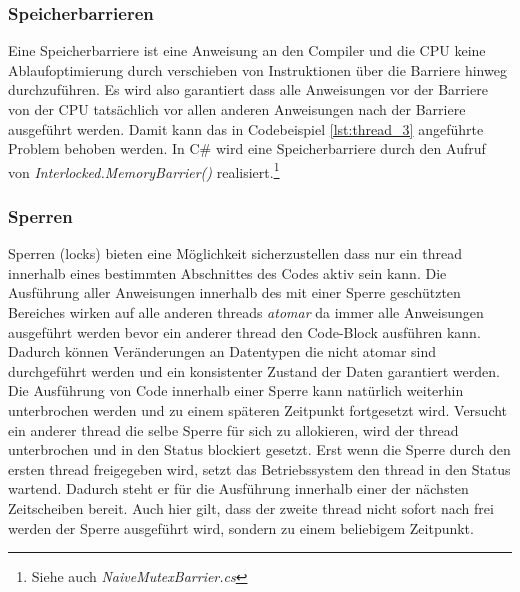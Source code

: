 \subsubsection{Speicherbarrieren}
Eine Speicherbarriere ist eine Anweisung an den Compiler und die CPU keine Ablaufoptimierung durch verschieben von Instruktionen über die Barriere hinweg durchzuführen. Es wird also garantiert dass alle Anweisungen vor der Barriere von der CPU tatsächlich vor allen anderen Anweisungen nach der Barriere ausgeführt werden.\cite[S. 195]{tanenbaum2016} Damit kann das in Codebeispiel \ref{lst:thread_3} angeführte Problem behoben werden. In C\# wird eine Speicherbarriere durch den Aufruf von \textit{Interlocked.MemoryBarrier()} realisiert.\cite{ms_interlocked_barrier}\footnote{Siehe auch \textit{NaiveMutexBarrier.cs}}

\subsubsection{Sperren}	
Sperren (locks) bieten eine Möglichkeit sicherzustellen dass nur ein thread innerhalb eines bestimmten Abschnittes des Codes aktiv sein kann. Die Ausführung aller Anweisungen innerhalb des mit einer Sperre geschützten Bereiches wirken auf alle anderen threads \textit{atomar} da immer alle Anweisungen ausgeführt werden bevor ein anderer thread den Code-Block ausführen kann. Dadurch können Veränderungen an Datentypen die nicht atomar sind durchgeführt werden und ein konsistenter Zustand der Daten garantiert werden. 
\\Die Ausführung von Code innerhalb einer Sperre kann natürlich weiterhin unterbrochen werden und zu einem späteren Zeitpunkt fortgesetzt wird. Versucht ein anderer thread die selbe Sperre für sich zu allokieren, wird der thread unterbrochen und in den Status blockiert gesetzt. Erst wenn die Sperre durch den ersten thread freigegeben wird, setzt das Betriebssystem den thread in den Status wartend. Dadurch steht er für die Ausführung innerhalb einer der nächsten Zeitscheiben bereit. Auch hier gilt, dass der zweite thread nicht sofort nach frei werden der Sperre ausgeführt wird, sondern zu einem beliebigem Zeitpunkt.

